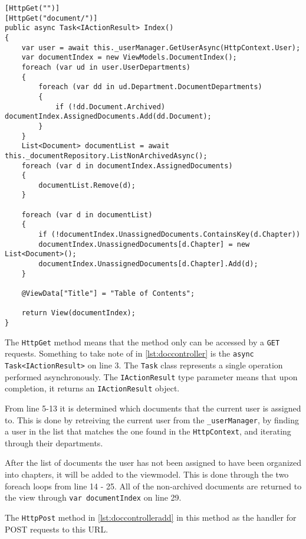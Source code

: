 \documentclass[../../master.tex]{subfiles}
\begin{document}
\begin{lstlisting}[caption={Document Controller: Index}, label={lst:doccontroller}]
[HttpGet("")]
[HttpGet("document/")]
public async Task<IActionResult> Index()
{
	var user = await this._userManager.GetUserAsync(HttpContext.User);
	var documentIndex = new ViewModels.DocumentIndex();
	foreach (var ud in user.UserDepartments)
	{
		foreach (var dd in ud.Department.DocumentDepartments)
		{
			if (!dd.Document.Archived) documentIndex.AssignedDocuments.Add(dd.Document);
		}
	}
	List<Document> documentList = await this._documentRepository.ListNonArchivedAsync();
	foreach (var d in documentIndex.AssignedDocuments)
	{
		documentList.Remove(d);
	}

	foreach (var d in documentList)
	{
		if (!documentIndex.UnassignedDocuments.ContainsKey(d.Chapter))
		documentIndex.UnassignedDocuments[d.Chapter] = new List<Document>();
		documentIndex.UnassignedDocuments[d.Chapter].Add(d);
	}

	@ViewData["Title"] = "Table of Contents";

	return View(documentIndex);
}
\end{lstlisting}

The \texttt{HttpGet} method means that the method only can be accessed by a \texttt{GET} requests.
Something to take note of in \cref{lst:doccontroller} is the \texttt{async Task<IActionResult>} on line 3.
The \texttt{Task} class represents a single operation \cite{microsoft} performed asynchronously.
The \texttt{IActionResult} type parameter means that upon completion, it returns an \texttt{IActionResult} object.

From line 5-13 it is determined which documents that the current user is assigned to.
This is done by retreiving the current user from the \texttt{_userManager}, by finding a user in the list that matches the one found in the \texttt{HttpContext}, and iterating through their departments.

After the list of documents the user has not been assigned to have been organized into chapters, it will be added to the viewmodel.
This is done through the two foreach loops from line 14 - 25.
All of the non-archived documents are returned to the view through \texttt{var documentIndex} on line 29.

The \texttt{HttpPost} method in \cref{lst:doccontrolleradd} in this method as the handler for POST requests to this URL.
\end{document}
